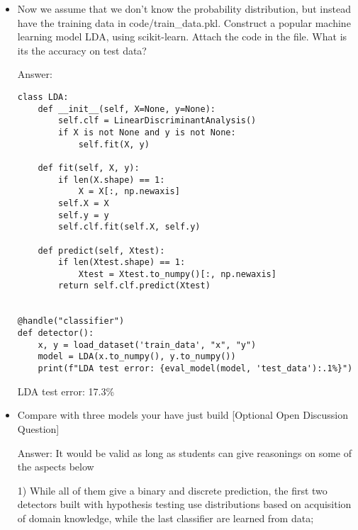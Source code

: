 \documentclass{article}
\newenvironment{answer}{\par\begingroup\color{answer}Answer: }{\endgroup}
\begin{document}
\begin{itemize}
\begin{answer}
We get the Bayes-optimum detector 
\[
  \delta(x) = 
\begin{cases}
  1,~if~x \geq -0.2\\
  0,~if~x < -0.2
\end{cases}
\]

Use them to make predictions on the given test data will get:

Neyman-Pearson detector test error: 25.4\% 

Bayes-Optimum detector test error: 17.3\%

\end{answer}
\item Now we assume that we don't know the probability distribution, but instead have the training data in code/train\_data.pkl. Construct a popular machine learning model LDA, using scikit-learn. Attach the code in the file. What is its the accuracy on test data?

\begin{answer}
\begin{verbatim}
class LDA:
    def __init__(self, X=None, y=None):
        self.clf = LinearDiscriminantAnalysis()
        if X is not None and y is not None:
            self.fit(X, y)

    def fit(self, X, y):
        if len(X.shape) == 1:
            X = X[:, np.newaxis]
        self.X = X
        self.y = y
        self.clf.fit(self.X, self.y)

    def predict(self, Xtest):
        if len(Xtest.shape) == 1:
            Xtest = Xtest.to_numpy()[:, np.newaxis]
        return self.clf.predict(Xtest)


@handle("classifier")
def detector():
    x, y = load_dataset('train_data', "x", "y")
    model = LDA(x.to_numpy(), y.to_numpy())
    print(f"LDA test error: {eval_model(model, 'test_data'):.1%}")
\end{verbatim}

LDA test error: 17.3\%
\end{answer}

\item Compare with three models your have just build [Optional Open Discussion Question]
\begin{answer}
It would be valid as long as students can give reasonings on some of the aspects below

1) While all of them give a binary and discrete prediction, the first two detectors built with hypothesis testing use distributions based on acquisition of domain knowledge, while the last classifier are learned from data;


\end{answer}
\end{itemize}
\end{document}
